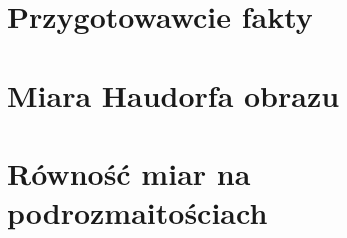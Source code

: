 \section{Przygotowawcie fakty}

\bigbreak

\bigbreak

\bigbreak

\bigbreak


\section{Miara Haudorfa obrazu}

\bigbreak

\bigbreak

\bigbreak

\section{Równość miar na podrozmaitościach}

